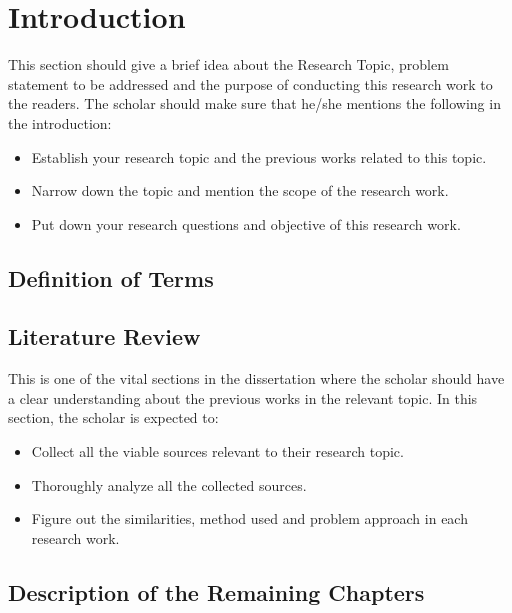 \chapter{Introduction}
This section should give a brief idea about the Research Topic, problem statement to be addressed and the purpose of conducting this research work to the readers.
The scholar should make sure that he/she mentions the following in the introduction:

\begin{itemize}
  \item Establish your research topic and the previous works related to this topic.
  \item Narrow down the topic and mention the scope of the research work.
  \item Put down your research questions and objective of this research work.
\end{itemize}

\section{Definition of Terms}
\blindtext%

\section{Literature Review}
This is one of the vital sections in the dissertation where the scholar should have a clear understanding about the previous works in the relevant topic.
In this section, the scholar is expected to:

\begin{itemize}
  \item Collect all the viable sources relevant to their research topic.
  \item Thoroughly analyze all the collected sources.
  \item Figure out the similarities, method used and problem approach in each research work.
\end{itemize}

\section{Description of the Remaining Chapters}
\blindtext%
